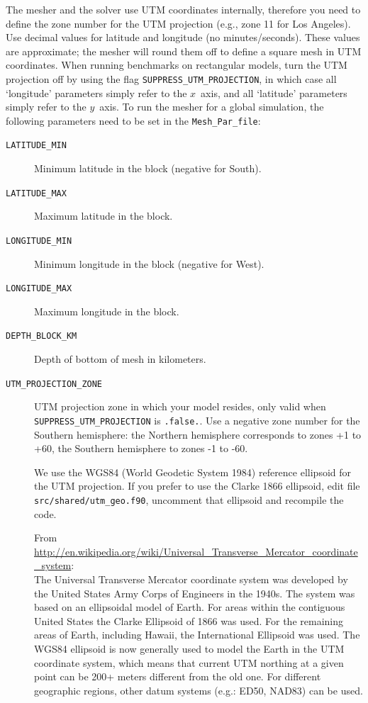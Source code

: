 The mesher and the solver use UTM coordinates internally, therefore
you need to define the zone number for the UTM projection (e.g., zone
11 for Los Angeles). Use decimal values for latitude and longitude
(no minutes/seconds). These values are approximate; the mesher will
round them off to define a square mesh in UTM coordinates. When running
benchmarks on rectangular models, turn the UTM projection off by using
the flag \texttt{\small SUPPRESS\_UTM\_PROJECTION},
in which case all `longitude' parameters simply refer to the $x$~axis, and
all `latitude' parameters simply refer to the $y$~axis. To run the
mesher for a global simulation, the following parameters need to be
set in the \texttt{\small Mesh\_Par\_file}:
%
\begin{description}
\item [{\texttt{LATITUDE\_MIN}}] Minimum latitude in the block (negative
for South).
\item [{\texttt{LATITUDE\_MAX}}] Maximum latitude in the block.
\item [{\texttt{LONGITUDE\_MIN}}] Minimum longitude in the block (negative
for West).
\item [{\texttt{LONGITUDE\_MAX}}] Maximum longitude in the block.
\item [{\texttt{DEPTH\_BLOCK\_KM}}] Depth of bottom of mesh in kilometers.
\item [{\texttt{UTM\_PROJECTION\_ZONE}}] UTM projection zone in
which your model resides, only valid when
\texttt{SUPPRESS\_UTM\_PROJECTION} is \texttt{.false.}.
Use a negative zone number for the Southern hemisphere:
the Northern hemisphere corresponds to zones +1 to +60,
the Southern hemisphere to zones -1 to -60.


We use the WGS84 (World Geodetic System 1984) reference ellipsoid for the UTM projection. If you prefer to use the Clarke 1866 ellipsoid,
edit file \texttt{src/shared/utm\_geo.f90}, uncomment that ellipsoid and recompile the code.

From \url{http://en.wikipedia.org/wiki/Universal_Transverse_Mercator_coordinate_system}:\\
The Universal Transverse Mercator coordinate system was developed by the United States Army Corps of Engineers in the 1940s.
The system was based on an ellipsoidal model of Earth. For areas within the contiguous United States
the Clarke Ellipsoid of 1866 was used. For the remaining areas of Earth, including Hawaii, the International Ellipsoid was used.
The WGS84 ellipsoid is now generally used to model the Earth in the UTM coordinate system,
which means that current UTM northing at a given point can be 200+ meters different from the old one.
For different geographic regions, other datum systems (e.g.: ED50, NAD83) can be used.


\end{description}
